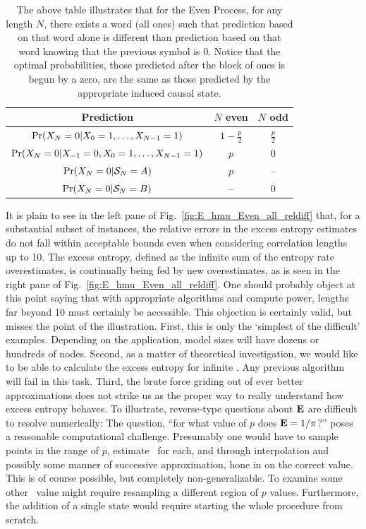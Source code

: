 \begin{table}
\centering
\begin{tabular}{|c|c|c|}
\hline
 Prediction & $N$ even & $N$ odd \\ \hline
$\Pr({X}_N = 0 | {X}_0 = 1, \ldots, {X}_{N-1}=1)$ & $1-\frac{p}{2}$ & $\frac{p}{2}$\\
$\Pr({X}_N = 0 | {X}_{-1} = 0, {X}_0 = 1, \ldots, {X}_{N-1}=1)$ & $p$ & 0 \\
$\Pr({X}_N=0 | \mathcal{S}_N=A)$ & $p$ & --\\
$\Pr({X}_N=0 | \mathcal{S}_N=B)$ & -- & 0 \\
\hline
\end{tabular}
\caption{The above table illustrates that for the Even Process, for any length $N$, there exists a word (all ones) such that prediction based on that word alone is different than prediction based on that word knowing that the previous symbol is 0. Notice that the optimal probabilities, those predicted after the block of ones is begun by a zero, are the same as those predicted by the appropriate induced causal state.}
\label{tab:EvenProcessProbs}
\end{table}

It is plain to see in the left pane of Fig.~\ref{fig:E_hmu_Even_all_reldiff} that, for a substantial subset of instances, the relative errors in the excess entropy estimates do not fall within acceptable bounds even when considering correlation lengths up to 10. The excess entropy, defined as the infinite sum of the entropy rate overestimates, is continually being fed by new overestimates, as is seen in the right pane of Fig.~\ref{fig:E_hmu_Even_all_reldiff}. One should probably object at this point saying that with appropriate algorithms and compute power, lengths far beyond 10 must certainly be accessible. This objection is certainly valid, but misses the point of the illustration. First, this is only the `simplest of the difficult' examples. Depending on the application, model sizes will have dozens or hundreds of nodes. Second, as a matter of theoretical investigation, we would like to be able to calculate the excess entropy for infinite \eMs. Any previous algorithm will fail in this task. Third, the brute force griding out of ever better approximations does not strike us as the proper way to really understand how excess entropy behaves. To illustrate, reverse-type questions about ${\bf E}$ are difficult to resolve numerically: The question, ``for what value of $p$ does ${\bf E}=1/\pi$?'' poses a reasonable computational challenge. Presumably one would have to sample points in the range of $p$, estimate \EE\ for each, and through interpolation and possibly some manner of successive approximation, hone in on the correct value. This is of course possible, but completely non-generalizable. To examine some other \EE\ value might require resampling a different region of $p$ values. Furthermore, the addition of a single state would require starting the whole procedure from scratch.


